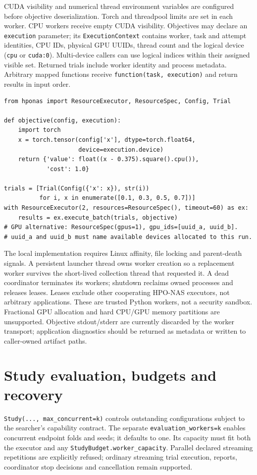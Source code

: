 CUDA visibility and numerical thread environment variables are configured
before objective deserialization. Torch and threadpool limits are set in each
worker. CPU workers receive empty CUDA visibility. Objectives may declare an
\texttt{execution} parameter; its \texttt{ExecutionContext} contains worker,
task and attempt identities, CPU IDs, physical GPU UUIDs, thread count and the
logical device (\texttt{cpu} or \texttt{cuda:0}). Multi-device callers can use
logical indices within their assigned visible set. Returned trials include
worker identity and process metadata. Arbitrary mapped functions receive
\texttt{function(task, execution)} and return results in input order.

\begin{Verbatim}[fontsize=\small]
from hponas import ResourceExecutor, ResourceSpec, Config, Trial

def objective(config, execution):
    import torch
    x = torch.tensor(config['x'], dtype=torch.float64,
                     device=execution.device)
    return {'value': float((x - 0.375).square().cpu()),
            'cost': 1.0}

trials = [Trial(Config({'x': x}), str(i))
          for i, x in enumerate([0.1, 0.3, 0.5, 0.7])]
with ResourceExecutor(2, resources=ResourceSpec(), timeout=60) as ex:
    results = ex.execute_batch(trials, objective)
# GPU alternative: ResourceSpec(gpus=1), gpu_ids=[uuid_a, uuid_b].
# uuid_a and uuid_b must name available devices allocated to this run.
\end{Verbatim}

The local implementation requires Linux affinity, file locking and parent-death
signals. A persistent launcher thread owns worker creation so a replacement
worker survives the short-lived collection thread that requested it. A dead
coordinator terminates its workers; shutdown reclaims owned processes and
releases leases. Leases exclude other cooperating HPO-NAS executors, not
arbitrary applications. These are trusted Python workers, not a security
sandbox. Fractional GPU allocation and hard CPU/GPU memory partitions are
unsupported. Objective stdout/stderr are currently discarded by the worker
transport; application diagnostics should be returned as metadata or written
to caller-owned artifact paths.

\section{Study evaluation, budgets and recovery}
\texttt{Study(..., max\_concurrent=k)} controls outstanding configurations
subject to the searcher's capability contract. The separate
\texttt{evaluation\_workers=k} enables concurrent endpoint folds and seeds;
it defaults to one. Its capacity must fit both the executor and any
\texttt{StudyBudget.worker\_capacity}. Parallel declared streaming repetitions
are explicitly refused; ordinary streaming trial execution, reports,
coordinator stop decisions and cancellation remain supported.

